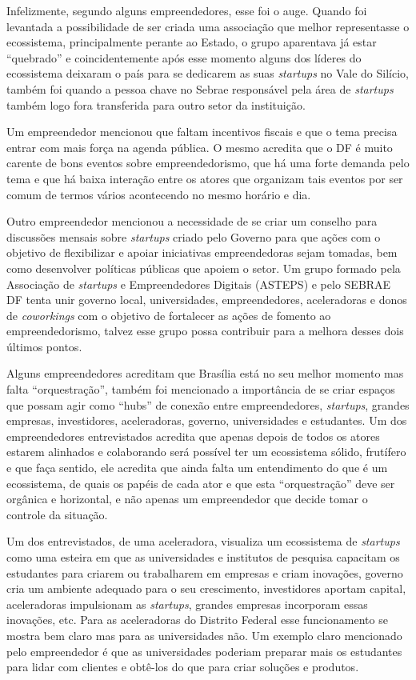 Infelizmente, segundo alguns empreendedores, esse foi o auge. Quando foi levantada a possibilidade de ser criada uma associação que melhor representasse o ecossistema, principalmente perante ao Estado, o grupo aparentava já estar ``quebrado'' e coincidentemente após esse momento alguns dos líderes do ecossistema deixaram o país para se dedicarem as suas \textit{startups} no Vale do Silício, também foi quando a pessoa chave no Sebrae responsável pela área de \textit{startups} também logo fora transferida para outro setor da instituição.

Um empreendedor mencionou que faltam incentivos fiscais e que o tema precisa entrar com mais força na agenda pública. O mesmo acredita que o DF é muito carente de bons eventos sobre empreendedorismo, que há uma forte demanda pelo tema e que há baixa interação entre os atores que organizam tais eventos por ser comum de termos vários acontecendo no mesmo horário e dia. 

Outro empreendedor mencionou a necessidade de se criar um conselho para discussões mensais sobre \textit{startups} criado pelo Governo para que ações com o objetivo de flexibilizar e apoiar iniciativas empreendedoras sejam tomadas, bem como desenvolver políticas públicas que apoiem o setor. Um grupo formado pela Associação de \textit{startups} e Empreendedores Digitais (ASTEPS) e pelo SEBRAE DF tenta unir governo local, universidades, empreendedores, aceleradoras e donos de \textit{coworkings} com o objetivo de fortalecer as ações de fomento ao empreendedorismo, talvez esse grupo possa contribuir para a melhora desses  dois últimos pontos.

Alguns empreendedores acreditam que Brasília está no seu melhor momento mas falta ``orquestração'', também foi mencionado a importância de se criar espaços que possam agir como ``hubs'' de conexão entre empreendedores, \textit{startups}, grandes empresas, investidores, aceleradoras, governo, universidades e estudantes. Um dos empreendedores entrevistados acredita que apenas depois de todos os atores estarem alinhados e colaborando será possível ter um ecossistema sólido, frutífero e que faça sentido, ele acredita que ainda falta um entendimento do que é um ecossistema, de quais os papéis de cada ator e que esta ``orquestração'' deve ser orgânica e horizontal, e não apenas um empreendedor que decide tomar o controle da situação. 

Um dos entrevistados, de uma aceleradora, visualiza um ecossistema de \textit{startups} como uma esteira em que as universidades e institutos de pesquisa capacitam os estudantes para criarem ou trabalharem em empresas e criam inovações, governo cria um ambiente adequado para o seu crescimento, investidores aportam capital, aceleradoras impulsionam as \textit{startups}, grandes empresas incorporam essas inovações, etc. Para as aceleradoras do Distrito Federal esse funcionamento se mostra bem claro mas para as universidades não. Um exemplo claro mencionado pelo empreendedor é que as universidades poderiam preparar mais os estudantes para lidar com clientes e obtê-los do que para criar soluções e produtos.

